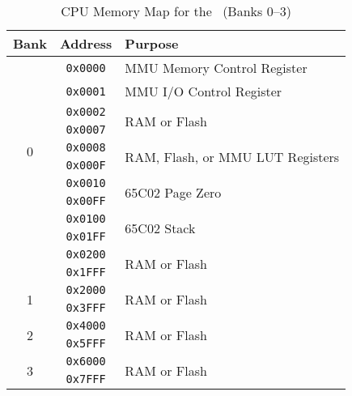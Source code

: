 \begin{table}[ht]
    \begin{center}
        \begin{tabular}{|c|c|l|} \hline
            Bank & Address & Purpose \\ \hline\hline
            \multirow{10}{*}{0} & \verb+0x0000+ & MMU Memory Control Register \\ \cline{2-3}
            & \verb+0x0001+ & MMU I/O Control Register \\ \cline{2-3}
            & \verb+0x0002+ & \multirow{2}{*}{RAM or Flash} \\ \cline{2-2}
            & \verb+0x0007+ & \\ \cline{2-3}
            & \verb+0x0008+ & \multirow{2}{*}{RAM, Flash, or MMU LUT Registers} \\ \cline{2-2}
            & \verb+0x000F+ & \\ \cline{2-3}
            & \verb+0x0010+ & \multirow{2}{*}{65C02 Page Zero} \\ \cline{2-2}
            & \verb+0x00FF+ & \\ \cline{2-3}
            & \verb+0x0100+ & \multirow{2}{*}{65C02 Stack} \\ \cline{2-2}
            & \verb+0x01FF+ & \\ \cline{2-3}
            & \verb+0x0200+ & \multirow{2}{*}{RAM or Flash} \\ \cline{2-2}
            & \verb+0x1FFF+ & \\ \hline
            \multirow{2}{*}{1} & \verb+0x2000+ & \multirow{2}{*}{RAM or Flash} \\ \cline{2-2}
            & \verb+0x3FFF+ & \\ \hline
            \multirow{2}{*}{2} & \verb+0x4000+ & \multirow{2}{*}{RAM or Flash} \\ \cline{2-2}
            & \verb+0x5FFF+ & \\ \hline
            \multirow{2}{*}{3} & \verb+0x6000+ & \multirow{2}{*}{RAM or Flash} \\ \cline{2-2}
            & \verb+0x7FFF+ & \\ \hline
        \end{tabular}
    \end{center}
    \caption{CPU Memory Map for the \jr\ (Banks 0--3)}
    \label{tab:cpu_mem_map}
\end{table}

